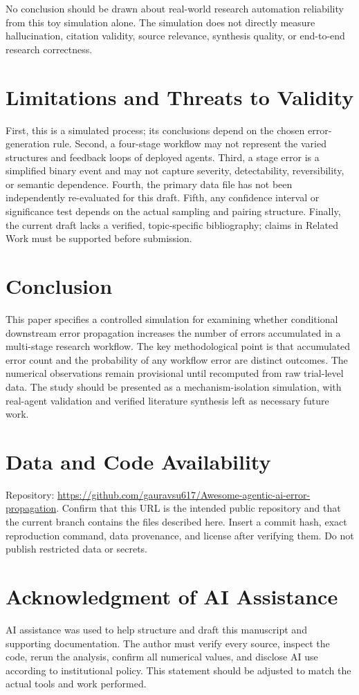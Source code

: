\documentclass[conference]{IEEEtran}
\begin{document}
No conclusion should be drawn about real-world research automation reliability from this toy simulation alone. The simulation does not directly measure hallucination, citation validity, source relevance, synthesis quality, or end-to-end research correctness.

\section{Limitations and Threats to Validity}
First, this is a simulated process; its conclusions depend on the chosen error-generation rule. Second, a four-stage workflow may not represent the varied structures and feedback loops of deployed agents. Third, a stage error is a simplified binary event and may not capture severity, detectability, reversibility, or semantic dependence. Fourth, the primary data file has not been independently re-evaluated for this draft. Fifth, any confidence interval or significance test depends on the actual sampling and pairing structure. Finally, the current draft lacks a verified, topic-specific bibliography; claims in Related Work must be supported before submission.

\section{Conclusion}
This paper specifies a controlled simulation for examining whether conditional downstream error propagation increases the number of errors accumulated in a multi-stage research workflow. The key methodological point is that accumulated error count and the probability of any workflow error are distinct outcomes. The numerical observations remain provisional until recomputed from raw trial-level data. The study should be presented as a mechanism-isolation simulation, with real-agent validation and verified literature synthesis left as necessary future work.

\section*{Data and Code Availability}
Repository: \url{https://github.com/gauravsu617/Awesome-agentic-ai-error-propagation}. Confirm that this URL is the intended public repository and that the current branch contains the files described here. Insert a commit hash, exact reproduction command, data provenance, and license after verifying them. Do not publish restricted data or secrets.

\section*{Acknowledgment of AI Assistance}
AI assistance was used to help structure and draft this manuscript and supporting documentation. The author must verify every source, inspect the code, rerun the analysis, confirm all numerical values, and disclose AI use according to institutional policy. This statement should be adjusted to match the actual tools and work performed.



\end{document}
